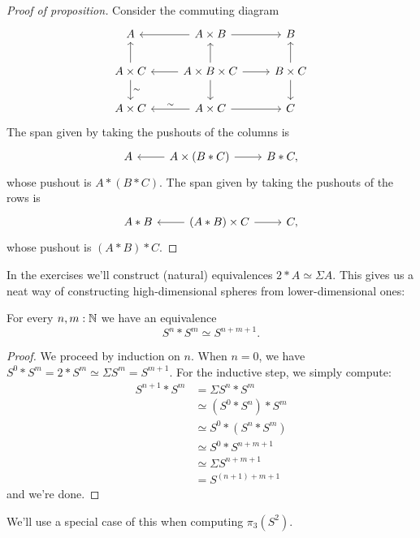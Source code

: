 \documentclass[10pt,oneside,leqno,openright]{memoir}
\begin{document}
\begin{proof}[Proof of proposition]
  Consider the commuting diagram
  \[
    \begin{tikzcd}
      A & A\times B\ar[l]\ar[r] & B \\
      A\times C\ar[u]\ar[d,"\sim"] & A\times B\times C\ar[l]\ar[r]\ar[u]\ar[d]
      & B\times C\ar[u]\ar[d] \\
      A\times C & A\times C\ar[l,"\sim"']\ar[r] & C
    \end{tikzcd}
  \]
  The span given by taking the pushouts of the columns is
  \[
    \begin{tikzcd}
      A & A \times (B*C) \ar[l]\ar[r] & B*C,
    \end{tikzcd}
  \]
  whose pushout is $A*(B*C)$. The span given by taking the pushouts of the rows is
  \[
    \begin{tikzcd}
      A*B & (A*B) \times C \ar[l]\ar[r] & C,
    \end{tikzcd}
  \]
  whose pushout is $(A*B)*C$.
\end{proof}
%
In the exercises we'll construct (natural) equivalences $2*A\simeq \Sigma A$.
%
This gives us a neat way of constructing high-dimensional spheres from lower-dimensional ones:
%
\begin{corollary}\label{cor:Sn-join-Sm}
  For every $n,m:\mathbb{N}$ we have an equivalence
  \[
    S^n * S^m \simeq S^{n+m+1}.
  \]
\end{corollary}
\begin{proof}
  We proceed by induction on $n$. When $n=0$, we have $S^0 * S^m = 2 * S^m \simeq \Sigma S^m = S^{m+1}$. For the inductive step, we simply compute:
  \begin{align*}
    S^{n+1} * S^m &= \Sigma S^n * S^m \\
    &\simeq (S^0 * S^n) * S^m \\
    &\simeq S^0 * (S^n * S^m) \\
    &\simeq S^0 * S^{n+m+1}\\
    &\simeq \Sigma S^{n+m+1}\\
    &= S^{(n+1) + m +1}
  \end{align*}
and we're done.
\end{proof}
We'll use a special case of this when computing $\pi_3(S^2)$.

\end{document}
